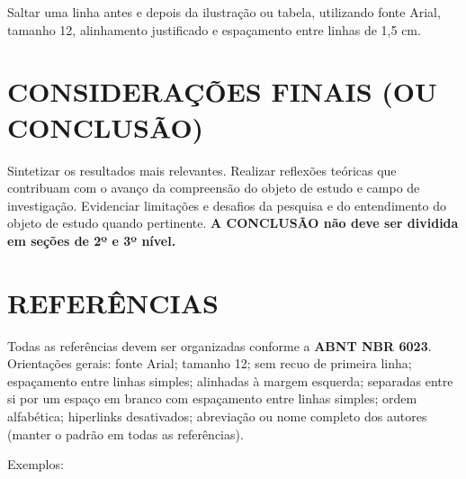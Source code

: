 \documentclass[12pt, a4paper]{article}
\begin{document}
Saltar uma linha antes e depois da ilustração ou tabela, utilizando fonte Arial, tamanho 12, alinhamento justificado e espaçamento entre linhas de 1,5 cm.

\section{CONSIDERAÇÕES FINAIS (OU CONCLUSÃO)}
Sintetizar os resultados mais relevantes. Realizar reflexões teóricas que contribuam com o avanço da compreensão do objeto de estudo e campo de investigação. Evidenciar limitações e desafios da pesquisa e do entendimento do objeto de estudo quando pertinente. \textbf{A CONCLUSÃO não deve ser dividida em seções de 2º e 3º nível.}

\section*{REFERÊNCIAS} %
\vspace{-0.5cm} 
\singlespacing
\begin{flushleft}
\noindent Todas as referências devem ser organizadas conforme a \textbf{ABNT NBR 6023}. Orientações gerais: fonte Arial; tamanho 12; sem recuo de primeira linha; espaçamento entre linhas simples; alinhadas à margem esquerda; separadas entre si por um espaço em branco com espaçamento entre linhas simples; ordem alfabética; hiperlinks desativados; abreviação ou nome completo dos autores (manter o padrão em todas as referências). 
\end{flushleft}

\noindent Exemplos:
\end{document}
